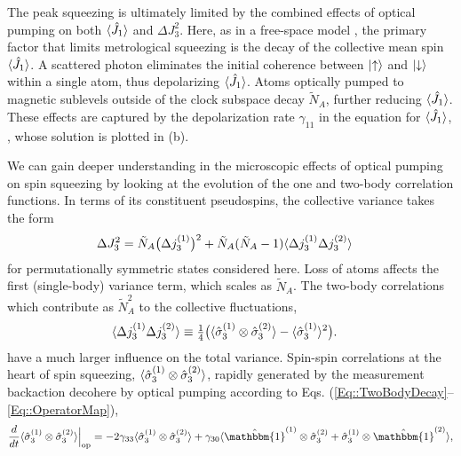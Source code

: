 \documentclass[preprint, aps,pra,onecolumn]{revtex4-1} %
\newcommand{\varz}{\Delta J_3^2}
\newcommand{\jx}{\hat{J}_1}
\newcommand{\NA}{\tilde{N}_A}
\begin{document}
The peak squeezing is ultimately limited by the combined effects of optical pumping on both $\expt{\jx}$ and $\varz$.  Here, as in a free-space model \cite{baragiola_three-dimensional_2014}, the primary factor that limits metrological squeezing is the decay of the collective mean spin $\expt{\jx}$. 
A scattered photon eliminates the initial coherence between $\lvert{\uparrow}\rangle$ and $\lvert{\downarrow}\rangle$ within a single atom, thus depolarizing $\expt{\jx}$.  
Atoms optically pumped to magnetic sublevels outside of the clock subspace decay $\NA$, further reducing $\expt{\jx}$. 
These effects are captured by the depolarization rate $\gamma_{11}$ in the equation for $\expt{\jx}$, , whose solution is plotted in (b).

We can gain deeper understanding in the microscopic effects of optical pumping on spin squeezing by looking at the evolution of the one and two-body correlation functions.  In terms of its constituent pseudospins, the collective variance takes the form
	\begin{align}
		\varz & = \tilde{N}_A \big( \Delta j_3^{(1)} \big)^2 + \tilde{N}_A(\tilde{N}_A-1) \expt{ \Delta j_3^{(1)} \Delta j_3^{(2)} }
	\end{align}
for permutationally symmetric states considered here. Loss of atoms affects the first (single-body) variance term, which scales as $\tilde{N}_A$.
The two-body correlations which contribute as $\tilde{N}_A^2$ to the collective fluctuations, 
	\begin{align}
		\langle{ \Delta j_3^{(1)} \Delta j_3^{(2)} }\rangle &\equiv \mbox{$\frac{1}{4}$} \big( \langle{ \hat{\sigma}_3^{(1)} \otimes \hat{\sigma}_3^{(2)}  }\rangle - \langle{\hat{\sigma}_3^{(1)} }\rangle^2  \big).
\end{align}
have a much larger influence on the total variance. Spin-spin correlations at the heart of spin squeezing, $\langle{ \hat{\sigma}_3^{(1)} \otimes \hat{\sigma}_3^{(2)} }\rangle$, rapidly generated by the measurement backaction decohere by optical pumping according to Eqs. (\ref{Eq::TwoBodyDecay}--\ref{Eq::OperatorMap}),
	\begin{align} \label{Eq::TwoBodySpinDecay}
		\frac{d}{dt} \expt{\hat{\sigma}_3^{(1)} \otimes \hat{\sigma}_3^{(2)} }  \Big|_{\rm op} = - 2 \gamma_{33}  \expt{\hat{\sigma}_3^{(1)} \otimes \hat{\sigma}_3^{(2)}} + \gamma_{30} \expt{ \hat{\mathbbm{1}}^{(1)} \otimes \hat{\sigma}_3^{(2)} + \hat{\sigma}_3^{(1)} \otimes \hat{\mathbbm{1}}^{(2)} },
	\end{align}
\end{document}
